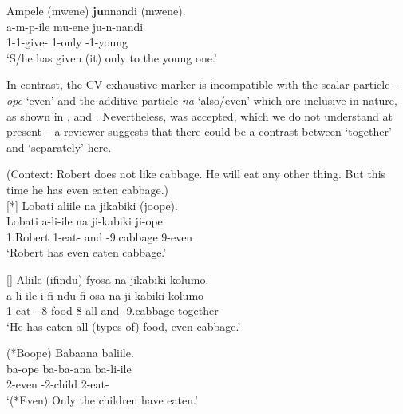 \documentclass[output=paper]{langscibook}
\begin{document}
\z


\ea
\label{bkm:Ref122591580}
Ampele (mwene) \textbf{ju}nnandi (mwene).\\
\gll
a-m-p-ile  mu-ene  ju-n-nandi\\
1\SM{}-1\OM{}-give-\PFV{}  1-only  \EXH{}-1-young\\
\glt
‘S/he has given (it) only to the young one.’ \citep[337]{vanderWalLusekelo2022}\\

\z


In contrast, the CV exhaustive marker is incompatible with the scalar particle -\textit{ope} ‘even’ and the additive particle \textit{na} ‘also/even’ which are inclusive in nature, as shown in , and . Nevertheless,  was accepted, which we do not understand at present – a reviewer suggests that there could be a contrast between ‘together’ and ‘separately’ here.\pagebreak

\ea
\label{bkm:Ref57358115}
(Context: Robert does not like cabbage. He will eat any other thing. But this time he has even eaten cabbage.)\\
\ea
[*]{
\label{bkm:Ref57358115:a}
Lobati aliile na jikabiki (joope).\\
\gll
Lobati  a-li-ile  na  ji-kabiki  ji-ope\\
1.Robert  1\SM{}-eat-\PFV{}  and  \EXH{}-9.cabbage  9-even\\
\glt ‘Robert has even eaten cabbage.’
}


\ex
[]{
\label{bkm:Ref57358115:b}
Aliile (ifindu) fyosa na jikabiki kolumo.\\
\gll
a-li-ile  i-fi-ndu  fi-osa  na  ji-kabiki  kolumo\\
1\SM{}-eat-\PFV{}  \AUG{}-8-food  8-all  and  \EXH{}-9.cabbage  together\\
\glt
‘He has eaten all (types of) food, even cabbage.’ \citep[337]{vanderWalLusekelo2022}\\
}

\z
\z

\ea
\label{bkm:Ref57358117}
(*Boope) Babaana baliile.\\
\gll
ba-ope  ba-ba-ana  ba-li-ile\\
2-even  \EXH{}-2-child  2\SM{}-eat-\PFV{}\\
\glt
‘(*Even) Only the children have eaten.’ \citep[337]{vanderWalLusekelo2022}\\
\end{document}
